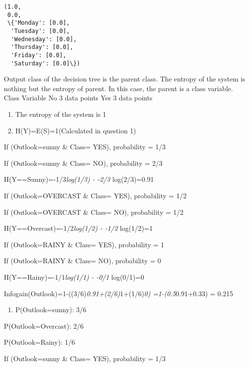 \documentclass[11pt]{article}
\makeatletter
\providecommand{\tightlist}{%
      \setlength{\itemsep}{0pt}\setlength{\parskip}{0pt}}
\newcommand{\boxspacing}{\kern\kvtcb@left@rule\kern\kvtcb@boxsep}
\newcommand{\prompt}[4]{
        {\ttfamily\llap{{\color{#2}[#3]:\hspace{3pt}#4}}\vspace{-\baselineskip}}
    }
\makeatother
\begin{document}
            \begin{tcolorbox}[breakable, size=fbox, boxrule=.5pt, pad at break*=1mm, opacityfill=0]
\prompt{Out}{outcolor}{112}{\boxspacing}
\begin{Verbatim}[commandchars=\\\{\}]
(1.0,
 0.0,
 \{'Monday': [0.0],
  'Tuesday': [0.0],
  'Wednesday': [0.0],
  'Thursday': [0.0],
  'Friday': [0.0],
  'Saturday': [0.0]\})
\end{Verbatim}
\end{tcolorbox}
        
    Output class of the decision tree is the parent class. The entropy of
the system is nothing but the entropy of parent. In this case, the
parent is a class variable. Class Variable No 3 data points Yes 3 data
points

\begin{enumerate}
\def\labelenumi{\arabic{enumi})}
\item
  The entropy of the system is 1
\item
  H(Y)=E(S)=1(Calculated in question 1)
\end{enumerate}

If (Outlook=sunny \& Class= YES), probability = 1/3

If (Outlook=sunny \& Class= NO), probability = 2/3

H(Y==Sunny)=-1/3\emph{log(1/3) - -2/3 } log(2/3)=0.91

If (Outlook=OVERCAST \& Class= YES), probability = 1/2

If (Outlook=OVERCAST \& Class= NO), probability = 1/2

H(Y==Overcast)=-1/2\emph{log(1/2) - -1/2 } log(1/2)=1

If (Outlook=RAINY \& Class= YES), probability = 1

If (Outlook=RAINY \& Class= NO), probability = 0

H(Y==Rainy)=-1/1\emph{log(1/1) - -0/1 } log(0/1)=0

Infogain(Outlook)=1-((3/6)\emph{0.91+(2/6)}1+(1/6)\emph{0)
=1-(0.5}0.91+0.33) = 0.215

\begin{enumerate}
\def\labelenumi{\arabic{enumi})}
\setcounter{enumi}{2}
\tightlist
\item
  P(Outlook=sunny): 3/6
\end{enumerate}

P(Outlook=Overcast): 2/6

P(Outlook=Rainy): 1/6

If (Outlook=sunny \& Class= YES), probability = 1/3
\end{document}
